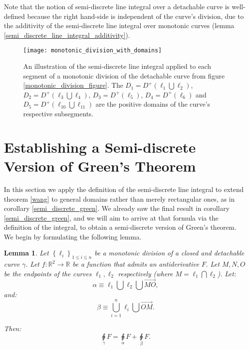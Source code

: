 \documentclass[11pt]{book}
\newtheorem{lem}[thm]{Lemma}
\begin{document}
Note that the notion of semi-discrete line integral over a detachable curve is well-defined because the right hand-side is independent of the curve’s division, due to the additivity of the semi-discrete line integral over monotonic curves (lemma \ref{semi_discrete_line_integral_additivity}).

\begin{figure}
\texttt{[image: monotonic\_division\_with\_domains]}
\caption{An illustration of the semi-discrete line integral applied to each segment of a monotonic division of the detachable curve from figure \ref{monotonic_division_figure}. The $D_1=D^+\left(\ell_1\bigcup\ell_2\right)$, $D_2=D^+\left(\ell_3\bigcup\ell_4\right)$, $D_3=D^+\left(\ell_5\right)$, $D_4=D^+\left(\ell_6\right)$ and $D_5=D^+\left(\ell_{10}\bigcup\ell_{11}\right)$ are the positive domains of the curve's respective subsegments.}
\label{monotonic_division_with_domains_figure}
\end{figure}

\section{Establishing a Semi-discrete Version of Green's Theorem} 
In this section we apply the definition of the semi-discrete line integral to extend theorem \ref{wang} to general domains rather than merely rectangular ones, as in  corollary \ref{semi_discrete_green}. We already saw the final result in corollary \ref{semi_discrete_green}, and we will aim to arrive at that formula via the definition of the integral, to obtain a semi-discrete version of Green's theorem.
We begin by formulating the following lemma.

\begin{lem}\label{ftc_lemma}Let $\left\{ \ell_{i}\right\} _{1\leq i\leq n}$ be a monotonic
division of a closed and detachable curve $\gamma$. Let $f:\mathbb{R}^{2}\rightarrow\mathbb{R}$
be a function that admits an antiderivative $F$. Let $M,N,O$ be
the endpoints of the curves $\ell_{1},\ell_{2}$ respectively (where
$M=\ell_{1}\bigcap\ell_{2}$). Let:
\[
\alpha\equiv\ell_{1}\bigcup\ell_{2}\bigcup\overrightarrow{MO},
\]
and:
\[
\beta\equiv \bigcup_{i=1}^{n} \ell_{i}\bigcup\overrightarrow{OM}.
\]

Then:
\[
\underset{\gamma}{\sqint}F=\underset{\alpha}{\sqint}F+\underset{\beta}{\sqint}F.
\]
\end{lem}
\end{document}
